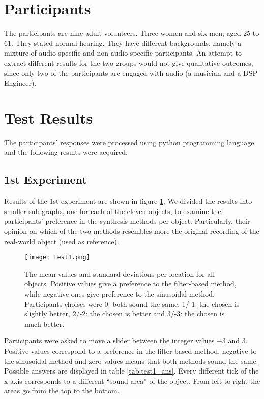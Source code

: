 \section{Participants}
The participants are nine adult volunteers. Three women and six men, aged $25$ to $61$. They stated normal hearing. They have different backgrounds, namely a mixture of audio specific and non-audio specific participants. An attempt to extract different results for the two groups would not give qualitative outcomes, since only two of the participants are engaged with audio (a musician and a \gls{DSP} Engineer).

\section{Test Results}
The participants' responses were processed using python programming language and the following results were acquired.

\subsection{1st Experiment}
Results of the 1st experiment are shown in figure \ref{fig:test1}. We divided the results into smaller sub-graphs, one for each of the eleven objects, to examine the participants' preference in the synthesis methods per object. Particularly, their opinion on which of the two methods resembles more the original recording of the real-world object (used as reference).

\begin{figure}[H]
  \centering
    \texttt{[image: test1.png]}
      \caption{The mean values and standard deviations per location for all objects. Positive values give a preference to the filter-based method, while negative ones give preference to the sinusoidal method. Participants choises were 0: both sound the same, 1/-1: the chosen is slightly better, 2/-2: the chosen is better and 3/-3: the chosen is much better.}\label{fig:test1}
\end{figure}

Participants were asked to move a slider between the integer values $-3$ and $3$. Positive values correspond to a preference in the filter-based method, negative to the sinusoidal method and zero values means that both methods sound the same. Possible answers are displayed in table \ref{tab:test1_ans}. Every different tick of the x-axis corresponds to a different ``sound area'' of the object. From left to right the areas go from the top to the bottom.

